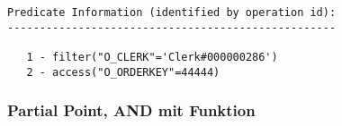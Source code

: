 \documentclass[11pt,a4paper,parskip=half]{scrartcl}
\begin{document}
\begin{lstlisting}
Predicate Information (identified by operation id):                                                                                                                                                                                                                                                          
---------------------------------------------------                                                                                                                                                                                                                                                          
                                                                                                                                                                                                                                                                                                             
   1 - filter("O_CLERK"='Clerk#000000286')                                                                                                                                                                                                                                                                   
   2 - access("O_ORDERKEY"=44444) 
\end{lstlisting}

\subsubsection{Partial Point, AND mit Funktion}
\end{document}
